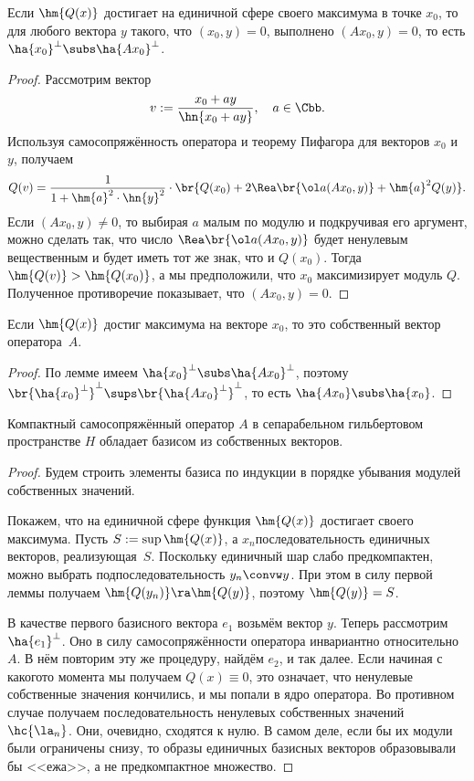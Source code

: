 \documentclass[a4paper]{article}
\begin{document}
\begin{lemma}
Если $\hm{Q(x)}$ достигает на единичной сфере своего максимума в точке $x_0$,
то для любого вектора $y$ такого, что $(x_0,y) = 0$, выполнено $(Ax_0, y) = 0$,
то есть $\ha{x_0}^\bot \subs \ha{Ax_0}^\bot$.
\end{lemma}
\begin{proof}
Рассмотрим вектор
$$v := \frac{x_0 + ay}{\hn{x_0 + ay}}, \quad a \in \Cbb.$$
Используя самосопряжённость оператора и теорему Пифагора для векторов $x_0$ и $y$, получаем
$$Q(v) = \frac{1}{1 + \hm{a}^2\cdot\hn{y}^2}\cdot\br{ Q(x_0) + 2\Rea\br{\ol a(Ax_0,y)} + \hm{a}^2Q(y)}.$$
Если $(Ax_0,y) \neq 0$, то выбирая $a$ малым по модулю и подкручивая его аргумент, можно сделать так,
что число $\Rea\br{\ol a(Ax_0,y)}$ будет ненулевым вещественным и будет иметь тот же знак, что и $Q(x_0)$.
Тогда $\hm{Q(v)} > \hm{Q(x_0)}$, а мы предположили, что $x_0$ максимизирует модуль $Q$. Полученное
противоречие показывает, что $(Ax_0,y) = 0$.
\end{proof}

\begin{imp}
Если $\hm{Q(x)}$ достиг максимума на векторе $x_0$, то это собственный вектор оператора~$A$.
\end{imp}
\begin{proof}
По лемме имеем $\ha{x_0}^\bot \subs \ha{Ax_0}^\bot$, поэтому $\br{\ha{x_0}^\bot}^\bot \sups
\br{\ha{Ax_0}^\bot}^\bot$, то есть $\ha{Ax_0} \subs \ha{x_0}$.
\end{proof}

\begin{theorem}
Компактный самосопряжённый оператор $A$ в сепарабельном гильбертовом пространстве $H$
обладает базисом из собственных векторов.
\end{theorem}
\begin{proof}
Будем строить элементы базиса по индукции в порядке убывания модулей собственных значений.

Покажем, что на единичной сфере функция $\hm{Q(x)}$ достигает своего максимума. Пусть $S := \sup \hm{Q(x)}$,
а $x_n$\т последовательность единичных векторов, реализующая~$S$. Поскольку единичный шар
слабо предкомпактен, можно выбрать подпоследовательность $y_n \convw y$. При этом
в силу первой леммы получаем $\hm{Q(y_n)} \ra \hm{Q(y)}$, поэтому $\hm{Q(y)} = S$.

В качестве первого базисного вектора $e_1$ возьмём вектор $y$. Теперь рассмотрим $\ha{e_1}^\bot$.
Оно в силу самосопряжённости оператора инвариантно относительно~$A$. В нём
повторим эту же процедуру, найдём $e_2$, и так далее.
Если начиная с какого\д то момента мы получаем $Q(x) \equiv 0$, это означает, что ненулевые собственные
значения кончились, и мы попали в ядро оператора. Во противном случае получаем последовательность
ненулевых собственных значений $\hc{\la_n}$. Они, очевидно, сходятся к нулю. В самом деле, если
бы их модули были ограничены снизу, то образы единичных базисных векторов образовывали бы <<ежа>>,
а не предкомпактное множество.
\end{proof}
\end{document}
